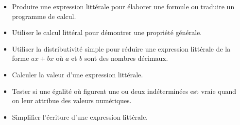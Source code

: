 \documentclass[a4paper,12pt,fleqn]{article}
\begin{document}
\begin{itemize}
	\item {}	Produire une expression littérale pour élaborer une formule ou traduire un programme de calcul.
	\item {}	Utiliser le calcul littéral pour démontrer une propriété générale.
	\item {}	Utiliser la distributivité simple pour réduire une expression littérale de la forme $ax + bx$ où $a$ et $b$ sont des nombres décimaux.
	\item {}	Calculer la valeur d’une expression littérale.
	\item {}	Tester si une égalité où figurent une ou deux indéterminées est vraie quand on leur attribue des valeurs numériques.
	\item {}	Simplifier l'écriture d'une expression littérale. %
\end{itemize}
\end{document}
